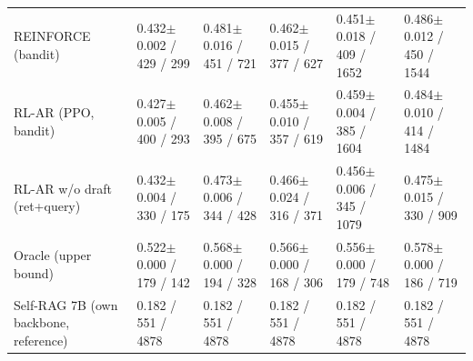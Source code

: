 \begin{table}
\begin{tabular}{llllll}
REINFORCE (bandit) & 0.432$\pm$0.002 / 429 / 299 & 0.481$\pm$0.016 / 451 / 721 & 0.462$\pm$0.015 / 377 / 627 & 0.451$\pm$0.018 / 409 / 1652 & 0.486$\pm$0.012 / 450 / 1544 \\
RL-AR (PPO, bandit) & 0.427$\pm$0.005 / 400 / 293 & 0.462$\pm$0.008 / 395 / 675 & 0.455$\pm$0.010 / 357 / 619 & 0.459$\pm$0.004 / 385 / 1604 & 0.484$\pm$0.010 / 414 / 1484 \\
RL-AR w/o draft (ret+query) & 0.432$\pm$0.004 / 330 / 175 & 0.473$\pm$0.006 / 344 / 428 & 0.466$\pm$0.024 / 316 / 371 & 0.456$\pm$0.006 / 345 / 1079 & 0.475$\pm$0.015 / 330 / 909 \\
Oracle (upper bound) & 0.522$\pm$0.000 / 179 / 142 & 0.568$\pm$0.000 / 194 / 328 & 0.566$\pm$0.000 / 168 / 306 & 0.556$\pm$0.000 / 179 / 748 & 0.578$\pm$0.000 / 186 / 719 \\
Self-RAG 7B (own backbone, reference) & 0.182 / 551 / 4878 & 0.182 / 551 / 4878 & 0.182 / 551 / 4878 & 0.182 / 551 / 4878 & 0.182 / 551 / 4878 \\
\bottomrule
\end{tabular}
\end{table}
